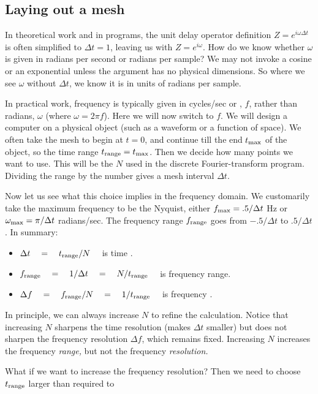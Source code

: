 \subsection{Laying out a mesh}
\par
In theoretical work and in programs,
the unit delay operator definition $Z=e^{i\omega \Delta t}$
is often simplified to $\Delta t = 1$,
leaving us with $ Z = e^{i\omega} $.
How do we know whether $\omega$
is given in radians per second or radians per sample?
We may not invoke a cosine or an exponential unless
the argument has no physical dimensions.
So where we see $\omega$ without $\Delta t$,
we know it is in units of radians per sample.
\par
In practical work,
frequency is typically given in cycles/sec or , $f$,
rather than radians, $\omega$
(where $\omega = 2\pi f$).
Here we will now switch to $f$.
We will design a computer  on a physical object
(such as a waveform or a function of space).
\label{'mesh'}
We often take the mesh to begin at $t=0$,
and continue till the end $t_{\rm max}$ of the object,
so the time range $t_{\rm range} = t_{\rm max}$.
Then we decide how many points we want to use.
This will be the $N$ used in the discrete Fourier-transform program.
Dividing the range by the number gives a mesh interval $\Delta t$.
\par
Now let us see what this choice implies in the frequency domain.
We customarily take the maximum frequency to be the Nyquist,
either $f_{\rm max} = .5 /\Delta t$ Hz or
$\omega_{\rm max} = \pi /\Delta t$ radians/sec.
The frequency range $f_{\rm range}$ goes from $-.5/\Delta t$ to $.5/\Delta t$.
In summary:
\begin{itemize}
\item $\Delta t \quad =\quad t_{\rm range} / N \quad$ is time .
\item $f_{\rm range} \quad =\quad 1/\Delta t \quad =\quad N /t_{\rm range} \quad$
	is frequency range.
\item $\Delta f \quad =\quad f_{\rm range}/N \quad =\quad 1/t_{\rm range} \quad$
	is frequency .
\end{itemize}
In principle, we can always increase $N$ to refine the calculation.
Notice that increasing $N$ sharpens the time resolution
(makes $\Delta t$ smaller)
but does not sharpen the frequency resolution
$\Delta f$, which remains fixed.
Increasing $N$ increases the frequency
{\em  range,}
but not the frequency
{\em  resolution.}
\par
What if we want to increase the frequency resolution?
Then we need to choose $t_{\rm range}$ larger than required to
